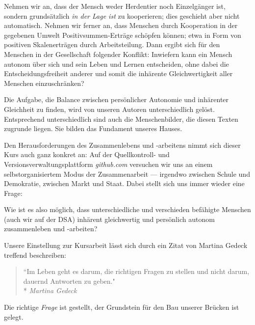 Nehmen wir an, dass der Mensch weder Herdentier noch Einzelgänger ist, sondern grundsätzlich \emph{in der Lage ist} zu kooperieren; dies geschieht aber nicht automatisch.
Nehmen wir ferner an, dass Menschen durch Kooperation in der gegebenen Umwelt Positivsummen-Erträge schöpfen können; etwa in Form von positiven Skalenerträgen durch Arbeitsteilung.
Dann ergibt sich für den Menschen in der Gesellschaft folgender Konflikt:
Inwiefern kann ein Mensch autonom über sich und sein Leben und Lernen entscheiden, ohne dabei die Entscheidungsfreiheit anderer und somit die inhärente Gleichwertigkeit aller Menschen einzuschränken?

Die Aufgabe, die Balance zwischen persönlicher Autonomie und inhärenter Gleichheit zu finden, wird von unseren Autoren unterschiedlich gelöst.
Entsprechend unterschiedlich sind auch die Menschenbilder, die diesen Texten zugrunde liegen.
Sie bilden das Fundament unseres Hauses.

Den Herausforderungen des Zusammenlebens und -arbeitens nimmt sich dieser Kurs auch ganz konkret an:
Auf der Quellkontroll- und Versionsverwaltungsplattform \emph{github.com} versuchen wir uns an einem selbstorganisiertem Modus der Zusammenarbeit --- irgendwo zwischen Schule und Demokratie, zwischen Markt und Staat.
Dabei stellt sich uns immer wieder eine Frage:

Wie ist es also möglich, dass unterschiedliche und verschieden befähigte Menschen (auch wir auf der DSA) inhärent gleichwertig und persönlich autonom zusammenleben und -arbeiten?

Unsere Einstellung zur Kursarbeit lässt sich durch ein Zitat von Martina Gedeck treffend beschreiben:

\begin{quote}
	``Im Leben geht es darum, die richtigen Fragen zu stellen und nicht darum, dauernd Antworten zu geben."\\*
	\emph{Martina Gedeck}
\end{quote}

Die richtige \emph{Frage} ist gestellt, der Grundstein für den Bau unserer Brücken ist gelegt.